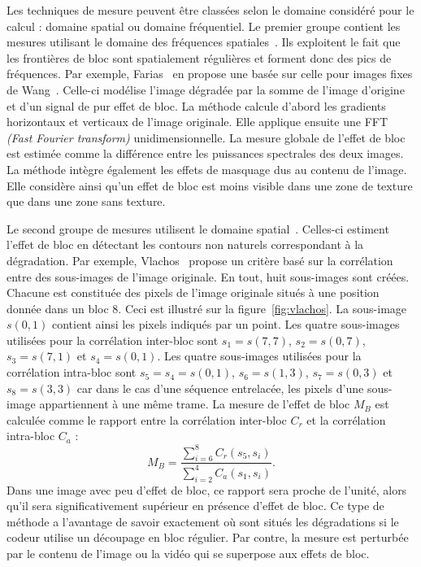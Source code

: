 Les techniques de mesure peuvent être classées selon le domaine considéré pour le calcul : domaine spatial ou domaine fréquentiel. Le premier groupe contient les mesures utilisant le domaine des fréquences spatiales~\cite{gao-tcsvt2002}. Ils exploitent le fait que les frontières de bloc sont spatialement régulières et forment donc des pics de fréquences. Par exemple, Farias~\cite{farias-phd} en propose une basée sur celle pour images fixes de Wang~\cite{wang-icip2000}. Celle-ci modélise l'image dégradée par la somme de l'image d'origine et d'un signal de pur effet de bloc. La méthode calcule d'abord les gradients horizontaux et verticaux de l'image originale. Elle applique ensuite une FFT \emph{(Fast Fourier transform)} unidimensionnelle. La mesure globale de l'effet de bloc est estimée comme la différence entre les puissances spectrales des deux images. La méthode intègre également les effets de masquage dus au contenu de l'image. Elle considère ainsi qu'un effet de bloc est moins visible dans une zone de texture que dans une zone sans texture.

Le second groupe de mesures utilisent le domaine spatial~\cite{pan-iscs2004,wang-icip2002}. Celles-ci estiment l'effet de bloc en détectant les contours non naturels correspondant à la dégradation. Par exemple, Vlachos~\cite{vlachos-detection} propose un critère basé sur la corrélation entre des sous-images de l'image originale. En tout, huit sous-images sont créées. Chacune est constituée des pixels de l'image originale situés à une position donnée dans un bloc 8. Ceci est illustré sur la figure~\ref{fig:vlachos}. La sous-image $s(0,1)$ contient ainsi les pixels indiqués par un point. Les quatre sous-images utilisées pour la corrélation inter-bloc sont $s_1=s(7,7)$, $s_2=s(0,7)$, $s_3=s(7,1)$ et $s_4=s(0,1)$. Les quatre sous-images utilisées pour la corrélation intra-bloc sont $s_5=s_4=s(0,1)$, $s_6=s(1,3)$, $s_7=s(0,3)$ et $s_8=s(3,3)$ car dans le cas d'une séquence entrelacée, les pixels d'une sous-image appartiennent à une même trame. %
La mesure de l'effet de bloc $M_B$ est calculée comme le rapport entre la corrélation inter-bloc $C_r$ et la corrélation intra-bloc $C_a$ :
\begin{equation}
M_B = \frac{\sum\limits_{i=6}^8 C_r(s_5, s_i)}{\sum\limits_{i=2}^4 C_a(s_1,s_i)}.
\end{equation}
%
Dans une image avec peu d'effet de bloc, ce rapport sera proche de l'unité, alors qu'il sera significativement supérieur en présence d'effet de bloc. Ce type de méthode a l'avantage de savoir exactement où sont situés les dégradations si le codeur utilise un découpage en bloc régulier. Par contre, la mesure est perturbée par le contenu de l'image ou la vidéo qui se superpose aux effets de bloc.

